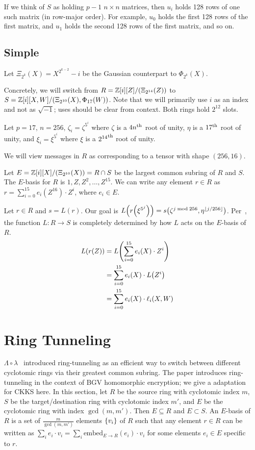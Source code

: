 \documentclass[../fheimpl.tex]{subfiles}
\begin{document}
	If we think of $S$ as holding $p-1$ $n\times n$ matrices, then $u_i$ holds 128 rows of one such matrix (in row-major order). For example, $u_0$ holds the first 128 rows of the first matrix, and $u_1$ holds the second 128 rows of the first matrix, and so on.
	
	
	
	\subsection{Simple}
	Let $\Xi_{2^k}(X) = X^{2^{k-2}} - i$ be the Gaussian counterpart to $\Phi_{2^k}(X)$.
	
	Concretely, we will switch from $R=\mathbb{Z}[i][Z]/(\Xi_{2^{14}}(Z))$ to $S=\mathbb{Z}[i][X,W]/(\Xi_{2^{10}}(X), \Phi_{17}(W))$. Note that we will primarily use $i$ as an index and not as $\sqrt{-1}$; uses should be clear from context. Both rings hold $2^{12}$ slots.
	
	Let $p=17$, $n=256$, $\zeta_i = \zeta^{5^i}$ where $\zeta$ is a $4n^{\mathrm{th}}$ root of unity, $\eta$ is a $17^{\mathrm{th}}$ root of unity, and $\xi_i=\xi^{5^i}$ where $\xi$ is a ${2^{14}}^{\mathrm{th}}$ root of unity.
	
	We will view messages in $R$ as corresponding to a tensor with shape $(256, 16)$.
	
	Let $E=\mathbb{Z}[i][X]/(\Xi_{2^{10}}(X)) = R \cap S$ be the largest common subring of $R$ and $S$. The $E$-basis for $R$ is ${1, Z, Z^2, \ldots, Z^{15}}$. We can write any element $r\in R$ as $r=\sum_{i=0}^{15} e_i(Z^{16})\cdot Z^i$, where $e_i\in E$.
	
	Let $r\in R$ and $s=L(r)$. Our goal is $L\parens*{r\parens*{\xi^{5^j}}} = s\parens*{\zeta^{j\bmod 256}, \eta^{\floor{j/256}}}$.  Per~\cite{cryptoeprint:2015/1134}, the function $L: R\rightarrow S$ is completely determined by how $L$ acts on the $E$-basis of $R$.
	\begin{align*}
		L\parens*{r\parens*{Z}} &= L\parens*{\sum_{i=0}^{15} e_i\parens*{X}\cdot Z^i} \\
		  &= \sum_{i=0}^{15} e_i\parens*{X}\cdot L\parens*{Z^i} \\
		  &= \sum_{i=0}^{15} e_i\parens*{X}\cdot \ell_i(X, W)
	\end{align*}

	\ifcompileasbook
	\else
	\printbibliography
	\fi
	
	\section{Ring Tunneling}
	$\Lambda\circ\lambda$~\cite{cryptoeprint:2015/1134} introduced ring-tunneling as an efficient way to switch between different cyclotomic rings via their greatest common subring. The paper introduces ring-tunneling in the context of BGV homomorphic encryption; we give a adaptation for CKKS here. In this section, let $R$ be the source ring with cyclotomic index $m$, $S$ be the target/destination ring with cyclotomic index $m'$, and $E$ be the cyclotomic ring with index $\gcd(m, m')$. Then $E\subseteq R$ and $E\subset S$. An $E$-basis of $R$ is a set of $\frac{m}{\gcd(m, m')}$ elements $\{v_i\}$ of $R$ such that any element $r\in R$ can be written as $\sum_{i} e_i\cdot v_i = \sum_{i} \mathrm{embed}_{E\rightarrow R}(e_i)\cdot v_i$ for some elements $e_i\in E$ specific to $r$.
	
\end{document}
